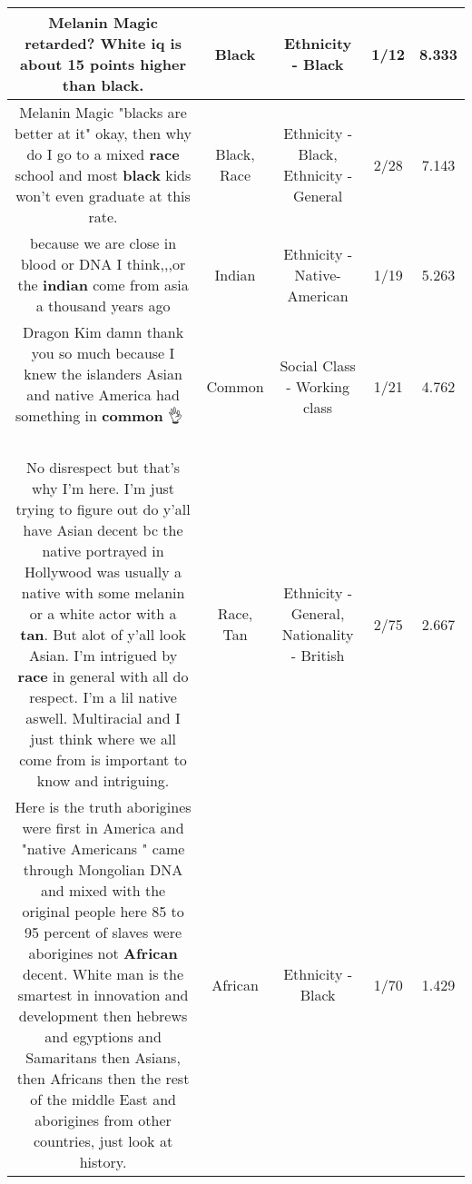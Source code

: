 \documentclass[11pt]{article}
\newlength\mylength
\begin{document}
\begin{center}
\begin{longtable}{|C{.65\mylength}|C{.30\mylength}|C{.12\mylength}|C{.12\mylength}|C{.12\mylength}|}
  \small Melanin Magic retarded? White iq is about 15 points higher than \textbf{black}.\normalsize   & Black & Ethnicity - Black & 1/12 & 8.333 \\  \hline
  \small Melanin Magic "blacks are better at it" okay, then why do I go to a mixed \textbf{race} school and most \textbf{black} kids won't even graduate at this rate.\normalsize   & Black, Race & Ethnicity - Black, Ethnicity - General & 2/28 & 7.143 \\  \hline
  \small because we are close in blood or DNA I think,,,or the \textbf{indian} come from asia a thousand years ago\normalsize   & Indian & Ethnicity - Native-American & 1/19 & 5.263 \\  \hline
  \small Dragon Kim damn thank you so much because I knew the islanders Asian and native America had something in \textbf{common} 👌👏👏👏\normalsize   & Common & Social Class - Working class & 1/21 & 4.762 \\  \hline
  \small No disrespect but that's why I'm here. I'm just trying to figure out do y'all have Asian decent bc the native portrayed in Hollywood was usually a native with some melanin or a white actor with a \textbf{tan}. But alot of y'all look Asian. I'm intrigued by \textbf{race} in general with all do respect. I'm a lil native aswell. Multiracial and I just think where we all come from is important to know and intriguing.\normalsize   & Race, Tan & Ethnicity - General, Nationality - British & 2/75 & 2.667 \\  \hline
  \small Here is the truth aborigines were first in America and "native Americans " came through Mongolian DNA and mixed with the original people here 85 to 95 percent of slaves were aborigines not \textbf{African} decent. White man is the smartest in innovation and development then hebrews and egyptions and Samaritans then Asians, then Africans then the rest of the middle East and aborigines from other countries, just look at history.\normalsize   & African & Ethnicity - Black & 1/70 & 1.429 \\  \hline

\end{longtable}
\end{center}
\end{document}
